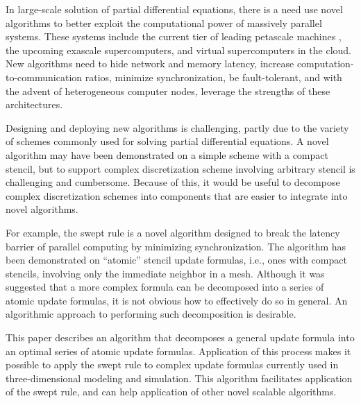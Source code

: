 \documentclass[review]{siamart0216}
\begin{document}
In large-scale solution of partial differential equations,
there is a need use novel algorithms to better exploit the
computational power of massively parallel systems\cite{dongarra2014applied,
pi2013cfd, larsson2014prospect}.
These systems include the current tier of leading petascale machines
\cite{bader2007petascale}, the
upcoming exascale supercomputers\cite{dongarra2011international,
amarasinghe2009exascale, shalf2010exascale},
and virtual supercomputers in the cloud\cite{jackson2010performance,
yelick2011magellan, saini2012application}.
New algorithms need to hide network and memory latency\cite{
chen1992reducing,wonnacott2000using, ghysels2013hiding, strumpen1994exploiting,
datta2009optimization},
increase computation-to-communication ratios\cite{rostrup2010parallel,
crovella1992using, barney2010introduction, boyd1995modeling},
minimize synchronization\cite{demmel2008avoiding, hoemmen2010communication,
carson2013avoiding}, be fault-tolerant\cite{cappello2009toward, shah2004highly,
kanellakis2013fault},
and with the advent of heterogeneous computer nodes,
leverage the strengths of these architectures\cite{keckler2011gpus,
danalis2010scalable, nickolls2010gpu, daga2011efficacy, mudalige2013design}.

Designing and deploying new algorithms is challenging, partly due to
the variety of schemes commonly used for solving partial differential
equations.  A novel algorithm may have been demonstrated on a simple scheme 
with a compact stencil, but to support complex discretization scheme
involving arbitrary stencil is challenging and cumbersome.  Because
of this, it would be useful to decompose complex discretization schemes
into components that are easier to integrate into novel algorithms.

For example, the swept rule\cite{alhubail2016swept} is a novel algorithm
designed to break the latency barrier of parallel computing by minimizing
synchronization.  The algorithm has been demonstrated on ``atomic''
stencil update formulas, i.e., ones with compact stencils, involving only
the immediate neighbor in a mesh.  Although it was suggested that a more
complex formula can be decomposed into a series of atomic update formulas,
it is not obvious how to effectively do so in general.
An algorithmic approach to performing such decomposition is desirable.

This paper describes an algorithm that decomposes a general update formula
into an optimal series of atomic update formulas.
Application of this process makes it possible to apply the swept rule to
complex update formulas currently used in three-dimensional modeling and
simulation.  This algorithm facilitates application of the swept rule, and
can help application of other novel scalable algorithms.
\end{document}

